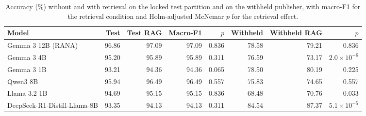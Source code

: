 \begin{table}[t]
\renewcommand{\tblwidth}{\textwidth}%
\small
\centering
\caption{Accuracy (\%) without and with retrieval on the locked test partition and on the withheld publisher, with macro-F1 for the retrieval condition and Holm-adjusted McNemar $p$ for the retrieval effect.}\label{tbl4}
\begin{tabular*}{\tblwidth}{@{\extracolsep{\fill}}LRRRRRRR@{}}
\toprule
\textbf{Model} & \textbf{Test} & \textbf{Test RAG} & \textbf{Macro-F1} & \textbf{$p$} & \textbf{Withheld} & \textbf{Withheld RAG} & \textbf{$p$} \\
\midrule
Gemma 3 12B (RANA) & 96.86 & 97.09 & 97.09 & 0.836 & 78.58 & 79.21 & 0.836 \\
Gemma 3 4B & 95.20 & 95.89 & 95.89 & 0.311 & 76.59 & 73.17 & $2.0\times10^{-6}$ \\
Gemma 3 1B & 93.21 & 94.36 & 94.36 & 0.065 & 78.50 & 80.19 & 0.225 \\
Qwen3 8B & 95.94 & 96.49 & 96.49 & 0.557 & 75.83 & 74.65 & 0.557 \\
Llama 3.2 1B & 94.69 & 95.15 & 95.15 & 0.836 & 68.48 & 70.76 & 0.033 \\
DeepSeek-R1-Distill-Llama-8B & 93.35 & 94.13 & 94.13 & 0.311 & 84.54 & 87.37 & $5.1\times10^{-5}$ \\
\bottomrule
\end{tabular*}
\end{table}

